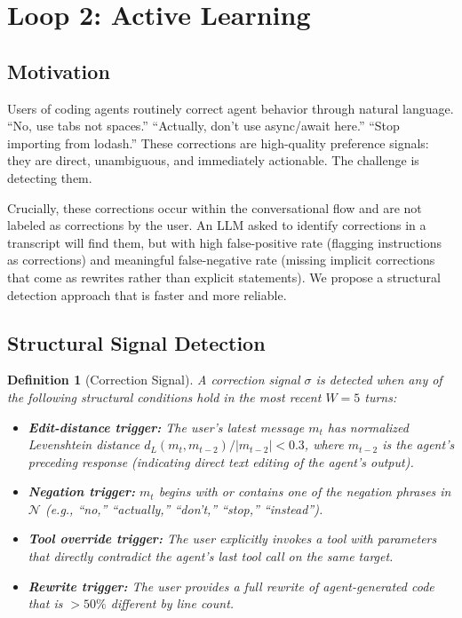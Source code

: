 \documentclass[11pt]{article}
\newtheorem{definition}{Definition}
\begin{document}
\section{Loop 2: Active Learning}
\label{sec:loop2}

\subsection{Motivation}

Users of coding agents routinely correct agent behavior through natural
language. ``No, use tabs not spaces.'' ``Actually, don't use async/await here.''
``Stop importing from lodash.'' These corrections are high-quality preference
signals: they are direct, unambiguous, and immediately actionable. The challenge
is detecting them.

Crucially, these corrections occur within the conversational flow and are not
labeled as corrections by the user. An LLM asked to identify corrections in a
transcript will find them, but with high false-positive rate (flagging
instructions as corrections) and meaningful false-negative rate (missing
implicit corrections that come as rewrites rather than explicit statements).
We propose a structural detection approach that is faster and more reliable.

\subsection{Structural Signal Detection}

\begin{definition}[Correction Signal]
\label{def:correction}
A correction signal $\sigma$ is detected when any of the following structural
conditions hold in the most recent $W=5$ turns:
\begin{itemize}[leftmargin=1.5em, nosep]
    \item \textbf{Edit-distance trigger:} The user's latest message $m_t$ has
          normalized Levenshtein distance $d_L(m_t, m_{t-2}) / |m_{t-2}| < 0.3$,
          where $m_{t-2}$ is the agent's preceding response (indicating direct
          text editing of the agent's output).
    \item \textbf{Negation trigger:} $m_t$ begins with or contains one of
          the negation phrases in $\mathcal{N}$ (e.g., ``no,'' ``actually,''
          ``don't,'' ``stop,'' ``instead'').
    \item \textbf{Tool override trigger:} The user explicitly invokes a tool
          with parameters that directly contradict the agent's last tool call
          on the same target.
    \item \textbf{Rewrite trigger:} The user provides a full rewrite of
          agent-generated code that is $>50\%$ different by line count.
\end{itemize}
\end{definition}
\end{document}
